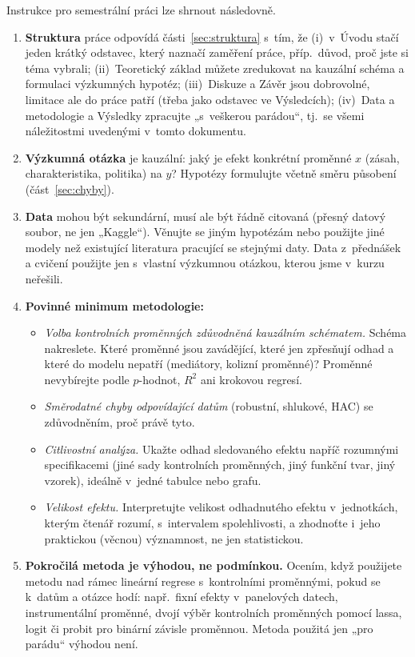 \documentclass[11pt,a4paper]{article}
\begin{document}
Instrukce pro semestrální práci lze shrnout následovně.
\begin{enumerate}[itemsep=3pt, topsep=3pt]
  \item \textbf{Struktura} práce odpovídá části~\ref{sec:struktura} s~tím, že (i)~v~Úvodu stačí jeden krátký odstavec, který naznačí zaměření práce, příp.\ důvod, proč jste si téma vybrali; (ii)~Teoretický základ můžete zredukovat na kauzální schéma a formulaci výzkumných hypotéz; (iii)~Diskuze a Závěr jsou dobrovolné, limitace ale do práce patří (třeba jako odstavec ve Výsledcích); (iv)~Data a metodologie a Výsledky zpracujte „s~veškerou parádou“, tj.\ se všemi náležitostmi uvedenými v~tomto dokumentu.
  \item \textbf{Výzkumná otázka} je kauzální: jaký je efekt konkrétní proměnné $x$ (zásah, charakteristika, politika) na $y$? Hypotézy formulujte včetně směru působení (část~\ref{sec:chyby}).
  \item \textbf{Data} mohou být sekundární, musí ale být řádně citovaná (přesný datový soubor, ne jen „Kaggle“). Věnujte se jiným hypotézám nebo použijte jiné modely než existující literatura pracující se stejnými daty. Data z~přednášek a cvičení použijte jen s~vlastní výzkumnou otázkou, kterou jsme v~kurzu neřešili.
  \item \textbf{Povinné minimum metodologie:}
  \begin{itemize}[itemsep=1pt, topsep=2pt]
    \item \textit{Volba kontrolních proměnných zdůvodněná kauzálním schématem.} Schéma nakreslete. Které proměnné jsou zavádějící, které jen zpřesňují odhad a které do modelu nepatří (mediátory, kolizní proměnné)? Proměnné nevybírejte podle $p$-hodnot, $R^2$ ani krokovou regresí.
    \item \textit{Směrodatné chyby odpovídající datům} (robustní, shlukové, HAC) se zdůvodněním, proč právě tyto.
    \item \textit{Citlivostní analýza.} Ukažte odhad sledovaného efektu napříč rozumnými specifikacemi (jiné sady kontrolních proměnných, jiný funkční tvar, jiný vzorek), ideálně v~jedné tabulce nebo grafu.
    \item \textit{Velikost efektu.} Interpretujte velikost odhadnutého efektu v~jednotkách, kterým čtenář rozumí, s~intervalem spolehlivosti, a zhodnoťte i~jeho praktickou (věcnou) významnost, ne jen statistickou.
  \end{itemize}
  \item \textbf{Pokročilá metoda je výhodou, ne podmínkou.} Ocením, když použijete metodu nad rámec lineární regrese s~kontrolními proměnnými, pokud se k~datům a otázce hodí: např.\ fixní efekty v~panelových datech, instrumentální proměnné, dvojí výběr kontrolních proměnných pomocí lassa, logit či probit pro binární závisle proměnnou. Metoda použitá jen „pro parádu“ výhodou není.

\end{enumerate}
\end{document}
